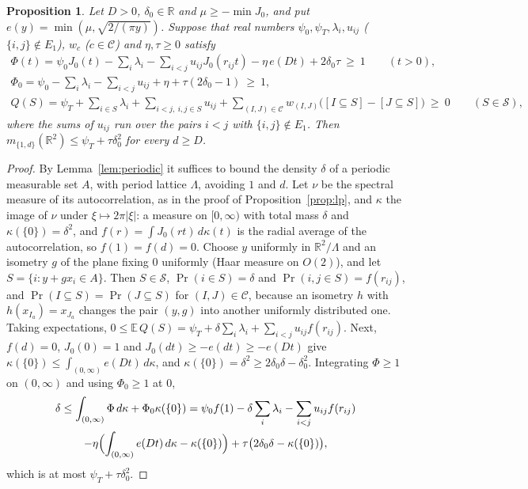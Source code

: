 \documentclass[11pt,a4paper]{amsart}
\newtheorem{proposition}[theorem]{Proposition}
\theoremstyle{definition}
\theoremstyle{remark}
\newcommand{\R}{\mathbb{R}}
\begin{document}
\begin{proposition}\label{prop:ie}
Let $D>0$, $\delta_0\in\R$ and $\mu\ge-\min J_0$, and put $e(y)=\min(\mu,\sqrt{2/(\pi y)})$. Suppose that real numbers
$\psi_0,\psi_T,\lambda_i,u_{ij}$ ($\{i,j\}\notin E_1$), $w_c$ ($c\in\mathcal C$) and $\eta,\tau\ge0$ satisfy
\begin{gather*}
\Phi(t)=\psi_0J_0(t)-\sum_i\lambda_i-\sum_{i<j}u_{ij}J_0(r_{ij}t)-\eta\,e(Dt)+2\delta_0\tau\ \ge\ 1\qquad(t>0),\\
\Phi_0=\psi_0-\sum_i\lambda_i-\sum_{i<j}u_{ij}+\eta+\tau(2\delta_0-1)\ \ge\ 1,\\
Q(S)=\psi_T+\sum_{i\in S}\lambda_i+\sum_{i<j,\ i,j\in S}u_{ij}+\sum_{(I,J)\in\mathcal C}w_{(I,J)}\bigl([I\subseteq S]-[J\subseteq S]\bigr)
\ \ge\ 0\qquad(S\in\mathcal S),
\end{gather*}
where the sums of $u_{ij}$ run over the pairs $i<j$ with $\{i,j\}\notin E_1$. Then
$m_{\{1,d\}}(\R^2)\le\psi_T+\tau\delta_0^2$ for every $d\ge D$.
\end{proposition}

\begin{proof}
By Lemma~\ref{lem:periodic} it suffices to bound the density $\delta$ of a periodic measurable set $A$, with period
lattice $\Lambda$, avoiding $1$ and $d$. Let $\nu$ be the spectral measure of its autocorrelation, as in the proof of
Proposition~\ref{prop:lp}, and $\kappa$ the image of $\nu$ under $\xi\mapsto2\pi|\xi|$: a measure on $[0,\infty)$ with
total mass $\delta$ and $\kappa(\{0\})=\delta^2$, and $f(r)=\int J_0(rt)\,d\kappa(t)$ is the radial average of the
autocorrelation, so $f(1)=f(d)=0$. Choose $y$ uniformly in $\R^2/\Lambda$ and an isometry $g$ of the plane fixing $0$
uniformly (Haar measure on $O(2)$), and let $S=\{i:y+gx_i\in A\}$. Then $S\in\mathcal S$, $\Pr(i\in S)=\delta$ and
$\Pr(i,j\in S)=f(r_{ij})$, and $\Pr(I\subseteq S)=\Pr(J\subseteq S)$ for $(I,J)\in\mathcal C$, because an isometry
$h$ with $h(x_{I_a})=x_{J_a}$ changes the pair $(y,g)$ into another uniformly distributed one. Taking expectations,
$0\le\mathbb E\,Q(S)=\psi_T+\delta\sum_i\lambda_i+\sum_{i<j}u_{ij}f(r_{ij})$. Next, $f(d)=0$, $J_0(0)=1$ and
$J_0(dt)\ge-e(dt)\ge-e(Dt)$ give $\kappa(\{0\})\le\int_{(0,\infty)}e(Dt)\,d\kappa$, and $\kappa(\{0\})=\delta^2\ge
2\delta_0\delta-\delta_0^2$. Integrating $\Phi\ge1$ on $(0,\infty)$ and using $\Phi_0\ge1$ at $0$,
\begin{multline*}
\delta\le\int_{(0,\infty)}\Phi\,d\kappa+\Phi_0\kappa(\{0\})=\psi_0f(1)-\delta\sum_i\lambda_i-\sum_{i<j}u_{ij}f(r_{ij})\\
-\eta\Bigl(\int_{(0,\infty)}e(Dt)\,d\kappa-\kappa(\{0\})\Bigr)+\tau\bigl(2\delta_0\delta-\kappa(\{0\})\bigr),
\end{multline*}
which is at most $\psi_T+\tau\delta_0^2$.
\end{proof}
\end{document}
